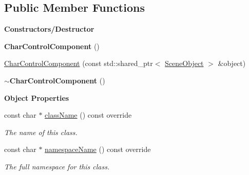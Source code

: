 \subsection*{Public Member Functions}
\begin{Indent}\textbf{ Constructors/\+Destructor}\par
\begin{DoxyCompactItemize}
\item 
\mbox{\label{classrev_1_1_char_control_component_aeae6070b8365b3a327613d7a209c8681}} 
{\bfseries Char\+Control\+Component} ()
\item 
\mbox{\hyperlink{classrev_1_1_char_control_component_ac7a09ab9128f6d06c4126ef386d47165}{Char\+Control\+Component}} (const std\+::shared\+\_\+ptr$<$ \mbox{\hyperlink{classrev_1_1_scene_object}{Scene\+Object}} $>$ \&object)
\item 
\mbox{\label{classrev_1_1_char_control_component_ae965fe837f47928e7547e7d01b40879f}} 
{\bfseries $\sim$\+Char\+Control\+Component} ()
\end{DoxyCompactItemize}
\end{Indent}
\begin{Indent}\textbf{ Object Properties}\par
\begin{DoxyCompactItemize}
\item 
const char $\ast$ \mbox{\hyperlink{classrev_1_1_char_control_component_ad48e482237a727ae8e07a3e2487a0fcb}{class\+Name}} () const override
\begin{DoxyCompactList}\small\item\em The name of this class. \end{DoxyCompactList}\item 
const char $\ast$ \mbox{\hyperlink{classrev_1_1_char_control_component_a62ac7aa35e708a0f0fcde627bababfd9}{namespace\+Name}} () const override
\begin{DoxyCompactList}\small\item\em The full namespace for this class. \end{DoxyCompactList}\end{DoxyCompactItemize}
\end{Indent}
